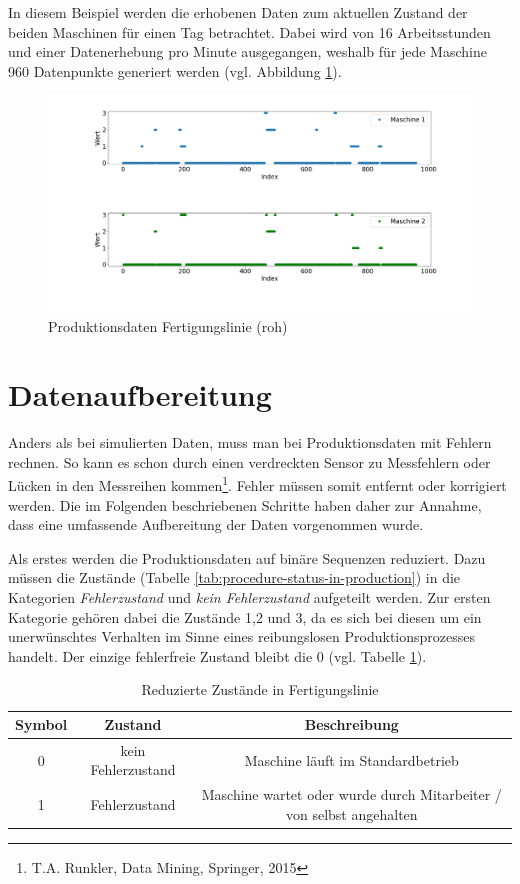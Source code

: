 In diesem Beispiel werden die erhobenen Daten zum aktuellen Zustand der beiden Maschinen für einen Tag betrachtet. Dabei wird von 16 Arbeitsstunden und einer Datenerhebung pro Minute ausgegangen, weshalb für jede Maschine 960 Datenpunkte generiert werden (vgl. Abbildung \ref{fig:procedure-raw-data}).

\begin{figure}[H]
	\centering
	\includegraphics[scale=0.32]{images/procedure/raw-data}
	\caption{Produktionsdaten Fertigungslinie (roh)}
	\label{fig:procedure-raw-data}
\end{figure}

\section{Datenaufbereitung}
Anders als bei simulierten Daten, muss man bei Produktionsdaten mit Fehlern rechnen. So kann es schon durch einen verdreckten Sensor zu Messfehlern oder Lücken in den Messreihen kommen\footnote{T.A. Runkler, Data Mining, Springer, 2015}. Fehler müssen somit entfernt oder korrigiert werden. Die im Folgenden beschriebenen Schritte haben daher zur Annahme, dass eine umfassende Aufbereitung der Daten vorgenommen wurde.

Als erstes werden die Produktionsdaten auf binäre Sequenzen reduziert. Dazu müssen die Zustände (Tabelle \ref{tab:procedure-status-in-production}) in die Kategorien \textit{Fehlerzustand} und \textit{kein Fehlerzustand} aufgeteilt werden. Zur ersten Kategorie gehören dabei die Zustände 1,2 und 3, da es sich bei diesen um ein unerwünschtes Verhalten im Sinne eines reibungslosen Produktionsprozesses handelt. Der einzige fehlerfreie Zustand bleibt die 0 (vgl. Tabelle \ref{tab:procedure-reduced-status-in-production}).

\begin{table}
	\begin{center}
		\begin{tabular}{|c c c|} 
			\hline
			Symbol & Zustand & Beschreibung \\
			\hline\hline
			0 & kein Fehlerzustand & Maschine läuft im Standardbetrieb \\ 
			\hline
			1 & Fehlerzustand & Maschine wartet oder wurde durch Mitarbeiter / von selbst angehalten  \\
			\hline
		\end{tabular}
		\caption{Reduzierte Zustände in Fertigungslinie}
		\label{tab:procedure-reduced-status-in-production}
	\end{center}
\end{table}

